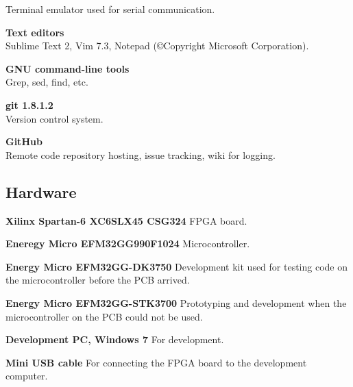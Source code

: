 \begin{description}
        Terminal emulator used for serial communication.
    \item{\textbf{Text editors}} \\
        Sublime Text 2, Vim 7.3, Notepad (©Copyright Microsoft Corporation).
    \item{\textbf{GNU command-line tools}} \\
        Grep, sed, find, etc.
    \item{\textbf{git 1.8.1.2}} \\
        Version control system.
    \item{\textbf{GitHub}} \\
        Remote code repository hosting, issue tracking, wiki for logging.
\end{description}

\subsection{Hardware}
\begin{description}
\item{\textbf{Xilinx Spartan-6 XC6SLX45 CSG324}}
    FPGA board.
\item{\textbf{Eneregy Micro EFM32GG990F1024}}
    Microcontroller.
\item{\textbf{Energy Micro EFM32GG-DK3750}}
    Development kit used for testing code on the microcontroller before the PCB arrived.
\item{\textbf{Energy Micro EFM32GG-STK3700}}
    Prototyping and development when the microcontroller on the PCB could not be used.
\item{\textbf{Development PC, Windows 7}}
    For development.
\item{\textbf{Mini USB cable}}
    For connecting the FPGA board to the development computer.
\end{description}
